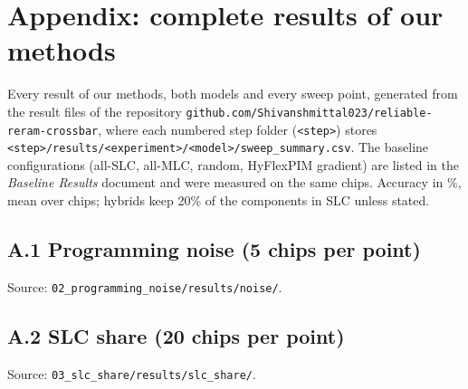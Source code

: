 \section*{Appendix: complete results of our methods}
Every result of our methods, both models and every sweep point, generated from the result files of the repository \nolinkurl{github.com/Shivanshmittal023/reliable-reram-crossbar}, where each numbered step folder (\nolinkurl{<step>}) stores \nolinkurl{<step>/results/<experiment>/<model>/sweep_summary.csv}. The baseline configurations (all-SLC, all-MLC, random, HyFlexPIM gradient) are listed in the \emph{Baseline Results} document and were measured on the same chips. Accuracy in \%, mean over chips; hybrids keep 20\% of the components in SLC unless stated.

\subsection*{A.1 Programming noise (5 chips per point)}
\noindent Source: \nolinkurl{02_programming_noise/results/noise/}.

\begin{table}[H]
\centering\footnotesize
\caption{Magnitude and Fisher placement against programming noise $\sigma$.}
\end{table}

\subsection*{A.2 SLC share (20 chips per point)}
\noindent Source: \nolinkurl{03_slc_share/results/slc_share/}.

